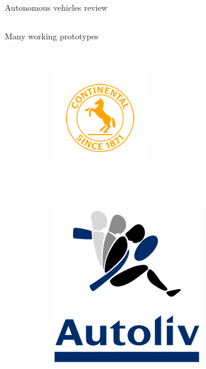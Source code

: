 \begin{frame}{Autonomous vehicles review}
\begin{columns}[T]
\begin{center}
\begin{overlayarea}{\textwidth}{\textheight}
{\begin{block}{Many working prototypes}
\begin{figure}[t]
	      ~
	      \begin{subfigure}[b]{0.2\textwidth}
		\includegraphics[width=\textwidth]{continental}
	      \end{subfigure}
	      \\~\\
	      \begin{subfigure}[b]{0.2\textwidth}
		\includegraphics[width=\textwidth]{autoliv}

\end{subfigure}
\end{figure}
\end{block}}
\end{overlayarea}
\end{center}
\end{columns}
\end{frame}
